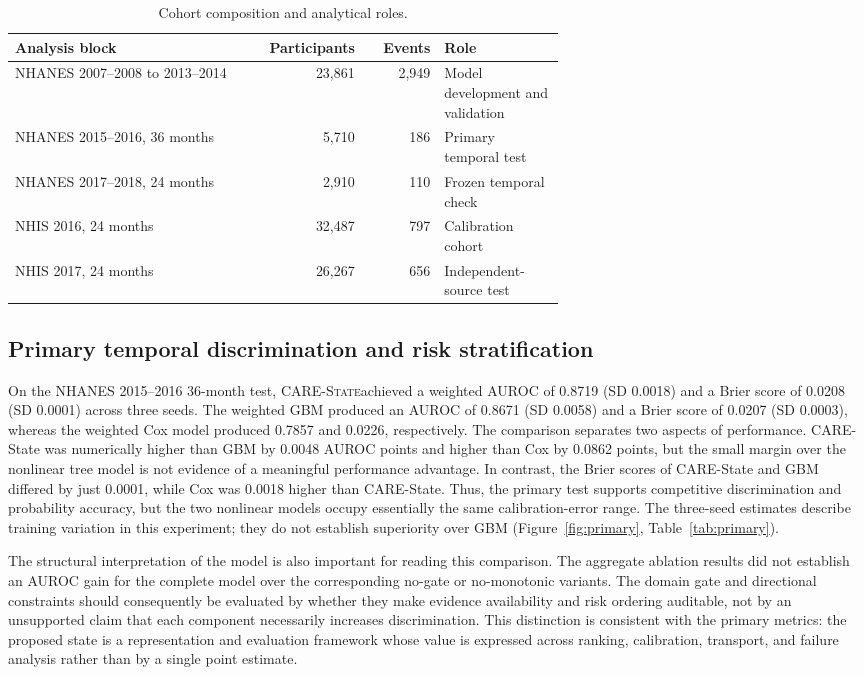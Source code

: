 \documentclass[12pt]{article}
\newcommand{\care}{\textsc{CARE-State}}
\begin{document}
\begin{table}[t]
\centering
\caption{Cohort composition and analytical roles.}
\label{tab:cohorts}
\begin{tabular}{p{0.42\linewidth}rrp{0.22\linewidth}}
\toprule
Analysis block & Participants & Events & Role \\
\midrule
NHANES 2007--2008 to 2013--2014 & 23,861 & 2,949 & Model development and validation \\
NHANES 2015--2016, 36 months & 5,710 & 186 & Primary temporal test \\
NHANES 2017--2018, 24 months & 2,910 & 110 & Frozen temporal check \\
NHIS 2016, 24 months & 32,487 & 797 & Calibration cohort \\
NHIS 2017, 24 months & 26,267 & 656 & Independent-source test \\
\bottomrule
\end{tabular}
\end{table}

\subsection{Primary temporal discrimination and risk stratification}
On the NHANES 2015--2016 36-month test, \care achieved a weighted AUROC of 0.8719 (SD 0.0018) and a Brier score of 0.0208 (SD 0.0001) across three seeds. The weighted GBM produced an AUROC of 0.8671 (SD 0.0058) and a Brier score of 0.0207 (SD 0.0003), whereas the weighted Cox model produced 0.7857 and 0.0226, respectively. The comparison separates two aspects of performance. CARE-State was numerically higher than GBM by 0.0048 AUROC points and higher than Cox by 0.0862 points, but the small margin over the nonlinear tree model is not evidence of a meaningful performance advantage. In contrast, the Brier scores of CARE-State and GBM differed by just 0.0001, while Cox was 0.0018 higher than CARE-State. Thus, the primary test supports competitive discrimination and probability accuracy, but the two nonlinear models occupy essentially the same calibration-error range. The three-seed estimates describe training variation in this experiment; they do not establish superiority over GBM (Figure~\ref{fig:primary}, Table~\ref{tab:primary}).

The structural interpretation of the model is also important for reading this comparison. The aggregate ablation results did not establish an AUROC gain for the complete model over the corresponding no-gate or no-monotonic variants. The domain gate and directional constraints should consequently be evaluated by whether they make evidence availability and risk ordering auditable, not by an unsupported claim that each component necessarily increases discrimination. This distinction is consistent with the primary metrics: the proposed state is a representation and evaluation framework whose value is expressed across ranking, calibration, transport, and failure analysis rather than by a single point estimate.
\end{document}
